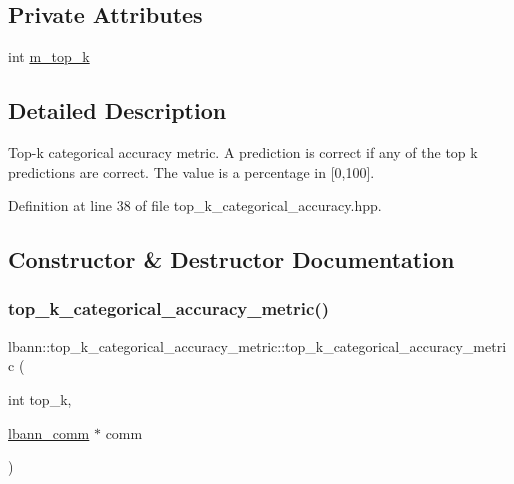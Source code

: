 \subsection*{Private Attributes}
\begin{DoxyCompactItemize}
\item 
int \hyperlink{classlbann_1_1top__k__categorical__accuracy__metric_a6cc172f6799bffac44de06d0657efdeb}{m\+\_\+top\+\_\+k}
\end{DoxyCompactItemize}


\subsection{Detailed Description}
Top-\/k categorical accuracy metric. A prediction is correct if any of the top k predictions are correct. The value is a percentage in \mbox{[}0,100\mbox{]}. 

Definition at line 38 of file top\+\_\+k\+\_\+categorical\+\_\+accuracy.\+hpp.



\subsection{Constructor \& Destructor Documentation}
\mbox{\label{classlbann_1_1top__k__categorical__accuracy__metric_a3896f230e2972c01b746fc808c51462e}} 
\subsubsection{\texorpdfstring{top\+\_\+k\+\_\+categorical\+\_\+accuracy\+\_\+metric()}{top\_k\_categorical\_accuracy\_metric()}\hspace{0.1cm}{\footnotesize\ttfamily [1/2]}}
{\footnotesize\ttfamily lbann\+::top\+\_\+k\+\_\+categorical\+\_\+accuracy\+\_\+metric\+::top\+\_\+k\+\_\+categorical\+\_\+accuracy\+\_\+metric (\begin{DoxyParamCaption}\item[{int}]{top\+\_\+k,  }\item[{\hyperlink{classlbann_1_1lbann__comm}{lbann\+\_\+comm} $\ast$}]{comm }\end{DoxyParamCaption})}

